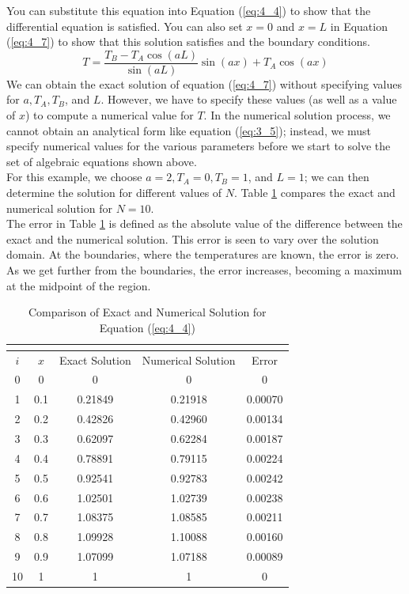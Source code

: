 \documentclass[12pt]{report}
\newcommand{\sps}{\\[0.2cm]}
\newcommand{\spn}[1]{\\[#1cm]}
\newcommand{\refn}[1]{(\ref{#1})}
\newcommand{\refx}[1]{\refn{eq:#1}}
\newcommand{\NI}{\noindent}
\begin{document}
	\NI You can substitute this equation into Equation \refx{4_4} to show that the differential equation is satisfied. You can also set $x = 0$ and $x = L$ in Equation \refx{4_7} to show that this solution satisfies and the boundary conditions.
	\begin{equation}
		T = \frac{T_B - T_A\cos(aL)}{\sin(aL)}\sin(ax) + T_A\cos(ax)\label{eq:4_7}
	\end{equation}
	We can obtain the exact solution of equation \refx{4_7} without specifying values for $a, T_A, T_B$, and $L$. However, we have to specify these values (as well as a value of $x$) to compute a numerical value for $T$. In the numerical solution process, we cannot obtain an analytical form like equation \refx{3_5}; instead, we must specify numerical values for the various parameters before we start to solve the set of algebraic equations shown above.\\
	
	\NI For this example, we choose $a = 2, T_A = 0, T_B = 1$, and $L = 1$; we can then determine the solution for different values of $N$. Table \ref{tb:4_1} compares the exact and numerical solution for $N = 10$.\\
	
	\NI The error in Table \ref{tb:4_1} is defined as the absolute value of the difference between the exact and the numerical solution. This error is seen to vary over the solution domain. At the boundaries, where the temperatures are known, the error is zero. As we get further from the boundaries, the error increases, becoming a maximum at the midpoint of the region.\sps
	\begin{longtable}{ccccc}
		\caption{Comparison of Exact and Numerical Solution for Equation \refx{4_4}}\\
		\label{tb:4_1}\spn{-1} \hline
		$i$ & $x$ & Exact Solution & Numerical Solution & Error\\
		0 & 0 & 0 & 0 & 0\\
		1 & 0.1 & 0.21849 & 0.21918 & 0.00070\\
		2 & 0.2 & 0.42826 & 0.42960 & 0.00134\\
		3 & 0.3 & 0.62097 & 0.62284 & 0.00187\\
		4 & 0.4 & 0.78891 & 0.79115 & 0.00224\\
		5 & 0.5 & 0.92541 & 0.92783 & 0.00242\\
		6 & 0.6 & 1.02501 & 1.02739 & 0.00238\\
		7 & 0.7 & 1.08375 & 1.08585 & 0.00211\\
		8 & 0.8 & 1.09928 & 1.10088 & 0.00160\\
		9 & 0.9 & 1.07099 & 1.07188 & 0.00089\\
		10 & 1 & 1 & 1 & 0\\ \hline
	\end{longtable}
	
\end{document}
